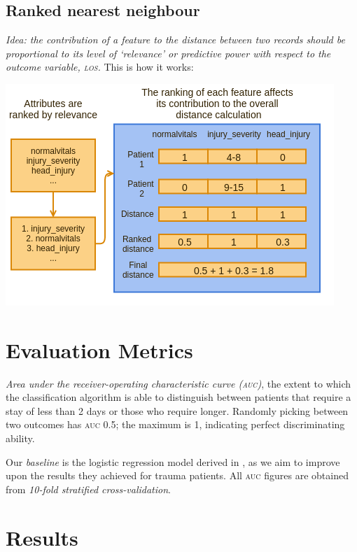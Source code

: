 \documentclass[portrait]{usydposter}
\newcommand{\acronym}[1]{\textsc{#1}\xspace}
\newcommand{\los}{\acronym{los}}
\newcommand{\auc}{\acronym{auc}}
\begin{document}
\begin{multicols}{3}
\subsection{Ranked nearest neighbour}
\noindent \textit{Idea: the contribution of a feature to the distance between
two records should be proportional to its level of `relevance' or predictive
power with respect to the outcome variable, \los.} This is how it works:
\begin{center}
\includegraphics[scale=0.75]{ranked-nn}
\end{center}

\section{Evaluation Metrics}
\noindent \textit{Area under the receiver-operating characteristic curve (\auc)},
the extent to which the classification algorithm is able to distinguish between
patients that require a stay of less than 2 days or those who require longer.
Randomly picking between two outcomes has \auc 0.5; the maximum is 1,
indicating perfect discriminating ability.

Our \textit{baseline} is the logistic regression model derived in
\cite{Dinh2013a}, as we aim to improve upon the results they achieved for
trauma patients.
All \auc figures are obtained from
\textit{10-fold stratified cross-validation}.

\section{Results}

\end{multicols}
\end{document}
